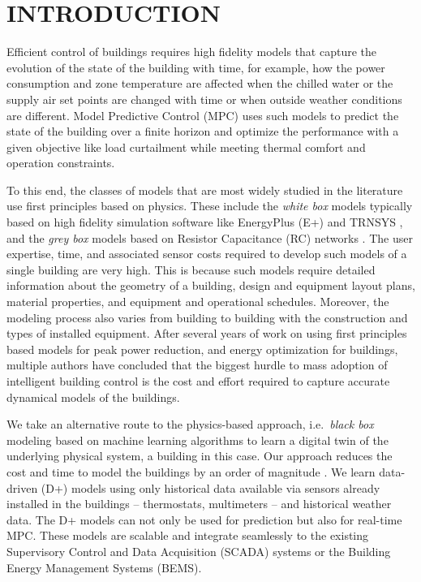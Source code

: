 \section{INTRODUCTION}
\label{S:intro}

Efficient control of buildings requires high fidelity models that capture the evolution of the state of the building with time, for example, how the power consumption and zone temperature are affected when the chilled water or the supply air set points are changed with time or when outside weather conditions are different.
Model Predictive Control (MPC) uses such models to predict the state of the building over a finite horizon and optimize the performance with a given objective like load curtailment while meeting thermal comfort and operation constraints.

To this end, the classes of models that are most widely studied in the literature use first principles based on physics. 
These include the \textit{white box} models typically based on high fidelity simulation software like EnergyPlus (E+) \cite{Deru2011} and TRNSYS \cite{Transys1975}, and the \textit{grey box} models based on Resistor Capacitance (RC) networks \cite{Deng2010}.
The user expertise, time, and associated sensor costs required to develop such models of a single building are very high.
This is because such models require detailed information about the geometry of a building, design and equipment layout plans, material properties, and equipment and operational schedules. 
Moreover, the modeling process also varies from building to building with the construction and types of installed equipment. 
After several years of work on using first principles based models for peak power reduction, and energy optimization for buildings, multiple authors \cite{Sturzenegger2016,vzavcekova2014} have concluded that the biggest hurdle to mass adoption of intelligent building control is the cost and effort required to capture accurate dynamical models of the buildings.

We take an alternative route to the physics-based approach, i.e.~\textit{black box} modeling based on machine learning algorithms to learn a digital twin of the underlying physical system, a building in this case.
Our approach reduces the cost and time to model the buildings by an order of magnitude \cite{JainICCPS2018,JainTCPS2018,JainCDC2017,JainACC2017,nghiemetal16gp,behletal15dradvisor}.
We learn data-driven (D+) models using only historical data available via sensors already installed in the buildings -- thermostats, multimeters -- and historical weather data.
The D+ models can not only be used for prediction but also for real-time MPC.
These models are scalable and integrate seamlessly to the existing Supervisory Control and Data Acquisition (SCADA) systems  or the Building Energy Management Systems (BEMS).

